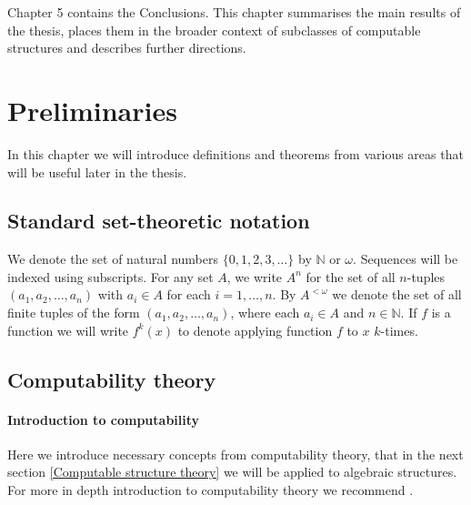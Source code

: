 \documentclass{pracalicmgr2025}
\theoremstyle{plain}            %
\theoremstyle{remark}           %
\theoremstyle{definition}       %
\begin{document}
Chapter 5 contains the Conclusions. This chapter summarises the main results of the thesis, places them in the broader context of subclasses of computable structures and describes further directions.


\chapter{Preliminaries}
In this chapter we will introduce definitions and theorems from various areas that will be useful later in the thesis.
\section{Standard set-theoretic notation}
We denote the set of natural numbers $\{0, 1, 2, 3, \dots\}$ by $\mathbb{N}$ or $\omega$. Sequences will be indexed using subscripts. For any set $A$, we write $A^n$ for the set of all $n$-tuples $(a_1, a_2, \dots, a_n)$ with $a_i \in A$ for each $i = 1, \dots, n$. By $A^{<\omega}$ we denote the set of all finite tuples of the form $(a_1, a_2, \dots, a_n)$, where each $a_i \in A$ and $n \in \mathbb{N}$. If $f$ is a function we will write $f^k(x)$ to denote applying function $f$ to $x$ $k$-times.


\section{Computability theory} \label{2.1}

\subsubsection{Introduction to computability}
Here we introduce necessary concepts from computability theory, that in the next section \ref{Computable structure theory} we will be applied to algebraic structures. For more in depth introduction to computability theory we recommend \cite{rogers1987theoryTURING}.
\end{document}
